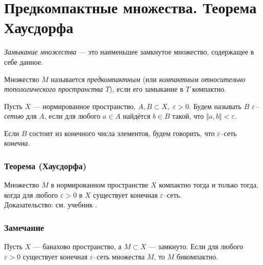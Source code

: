 \section{Предкомпактные множества. Теорема Хаусдорфа}
\label{sec:q-35}

\textit{Замыкание множества} --- это наименьшее замкнутое множество, содержащее в себе данное.

Множество $M$ называется \textit{предкомпактным} (или \textit{компактным относительно топологического пространства} $T$), если его замыкание в $T$ компактно.

Пусть $X$ --- нормированное пространство, $A, B \subset X, \; \varepsilon > 0$. Будем называть $B$ \textit{$\varepsilon$--сетью} для $A$, если для любого $a \in A$ найдётся $b \in B$ такой, что $\Vert a, b\Vert < \varepsilon$.

Если $B$ состоит из конечного числа элементов, будем говорить, что $\varepsilon$--сеть \textit{конечна}.

\subsubsection*{Теорема (Хаусдорфа)}
Множество $M$ в нормированном пространстве $X$ компактно тогда и только тогда, когда для любого $\varepsilon > 0$ в $X$ существует конечная $\varepsilon$--сеть.\\
Доказательство: см. учебник \cite[с.~195]{trenogin}.

\subsubsection*{Замечание}
Пусть $X$ --- банахово пространство, а $M \subset X$ --- замкнуто. Если для любого $\varepsilon > 0$ существует конечная $\varepsilon$--сеть множества $M$, то $M$ бикомпактно.